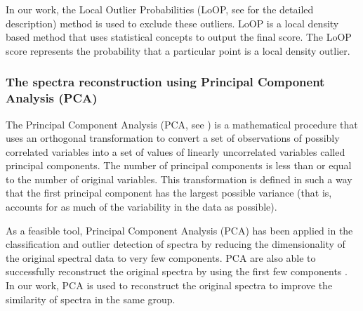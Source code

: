 \documentclass[manuscript]{aastex}
\begin{document}
In our work, the Local Outlier Probabilities (LoOP, see \cite{kriegel2009loop} for the detailed description) method is used to exclude these outliers.
LoOP is a local density based method that uses statistical concepts to output the final score.
The LoOP score represents the probability that a particular point is a local density outlier.


\subsubsection{The spectra reconstruction using Principal Component Analysis (PCA)}
The Principal Component Analysis  (PCA, see \cite{jolliffe2002principal}) is a mathematical procedure that uses an orthogonal transformation to convert a set of observations of possibly correlated variables into a set of values of linearly uncorrelated variables called principal components.
The number of principal components is less than or equal to the number of original variables.
This transformation is defined in such a way that the first principal component has the largest possible variance  (that is,  accounts for as much of the variability in the data as possible).

As a feasible tool, Principal Component Analysis (PCA) has been applied  in the classification and outlier detection of spectra \citep{whitney1983principal,bailer1998automated,yip2004spectral,tu2009new,tu2010method,almeida2013automated,wei2013mining,jiang2013data} by  reducing the dimensionality of the original spectral data to very few components.
PCA are also able to successfully reconstruct the original spectra by using the first few components \citep{singh1998stellar}.
In our work, PCA is used to reconstruct the original spectra to improve the similarity of spectra in the same group.
				
\end{document}

